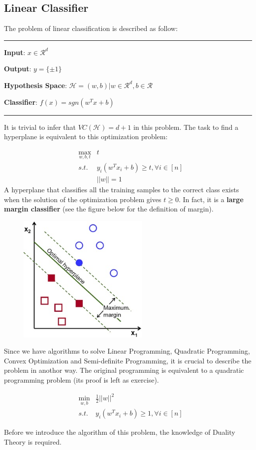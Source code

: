 \documentclass[UTF8]{article}
\begin{document}
\subsection{Linear Classifier}
The problem of linear classification is described as follow:\\
\rule{\textwidth}{0.5pt}\par
\textbf{Input}: $x\in\mathcal{R}^{d}$\par
\textbf{Output}: $y=\{\pm1\}$\par
\textbf{Hypothesis Space}: $\mathcal{H}={(w,b)|w\in\mathcal{R}^{d}, b\in\mathcal{R}}$\par
\textbf{Classifier}: $f(x)=sgn(w^{T}x+b)$\\
\rule{\textwidth}{0.5pt}\par
\vspace{9pt}
It is trivial to infer that $VC(\mathcal{H})=d+1$ in this problem. The task to find a hyperplane is equivalent to this optimization problem:\par
\begin{eqnarray*}
 &\max_{w,b,t} &t \\
&s.t. &y_{i}(w^{T}x_{i}+b)\geq t,\forall i\in[n]\\
& &||w||=1
\end{eqnarray*}
A hyperplane that classifies all the training samples to the correct class exists when the solution of the optimization problem gives $t\geq 0$. In fact, it is a \textbf{large margin classifier} (see the figure below for the definition of margin).\par
\begin{figure}[htbp]
\centerline{\includegraphics[width=2.5in]{optimal-hyperplane.jpg}}
\end{figure}\par
Since we have algorithms to solve Linear Programming, Quadratic Programming, Convex Optimization and Semi-definite Programming, it is crucial to describe the problem in anothor way. The original programming is equivalent to a quadratic programming problem (its proof is left as exercise).\par
\begin{eqnarray*}
&\min_{w,b} & \frac{1}{2}||w||^{2}\\
&s.t. &y_{i}(w^{T}x_{i}+b)\geq 1,\forall i\in[n]
\end{eqnarray*}\par
Before we introduce the algorithm of this problem, the knowledge of Duality Theory is required.\par
\end{document}
